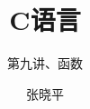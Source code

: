 \documentclass[12pt,notheorems]{beamer}
\begin{document}
\title{C语言}
\subtitle{第九讲、函数}
\author{张晓平}


\begin{frame}[plain]\transboxout
\titlepage
\end{frame}

\begin{frame}[allowframebreaks]\transboxin
\begin{center}
\tableofcontents[hideallsubsections]
\end{center}
\end{frame}


                  
%


%  

 
\end{document}
